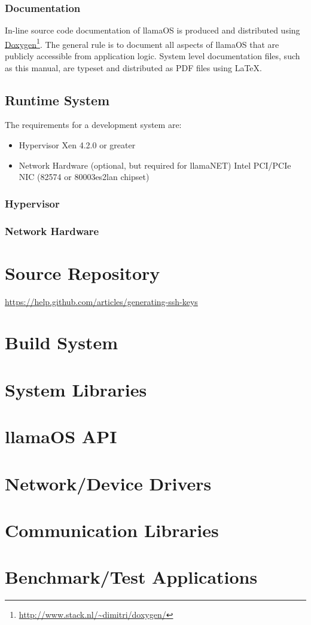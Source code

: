 \documentclass[draft]{article}
\begin{document}
\subsubsection{Documentation}

In-line source code documentation of llamaOS is produced and distributed using 
\href{http://www.stack.nl/~dimitri/doxygen/}{Doxygen}\footnote{\url{
http://www.stack.nl/~dimitri/doxygen/}}.  The general rule is to document all 
aspects of llamaOS that are publicly accessible from application logic.  System 
level documentation files, such as this manual, are typeset and distributed as 
PDF files using \LaTeX.

\subsection{Runtime System}

The requirements for a development system are:

\begin{itemize}
  \item Hypervisor
    \subitem Xen 4.2.0 or greater
  \item Network Hardware (optional, but required for llamaNET)
    \subitem Intel PCI/PCIe NIC (82574 or 80003es2lan chipset)
\end{itemize}

\subsubsection{Hypervisor}

\subsubsection{Network Hardware}

\section{Source Repository}





\url{https://help.github.com/articles/generating-ssh-keys}


\section{Build System}

\section{System Libraries}

\section{llamaOS API}

\section{Network/Device Drivers}

\section{Communication Libraries}

\section{Benchmark/Test Applications}
\end{document}
